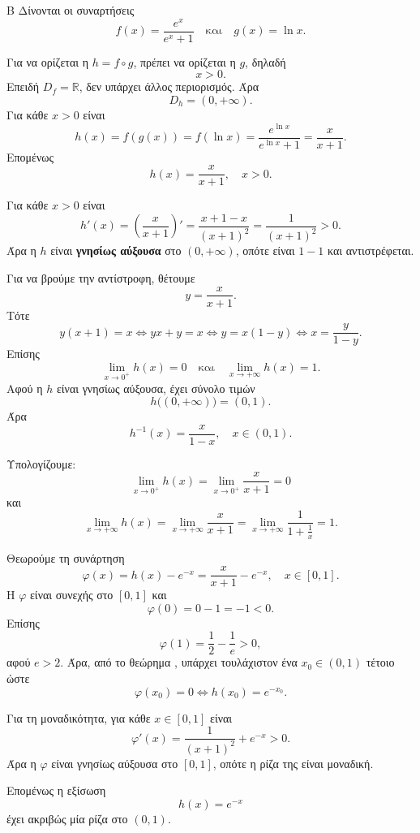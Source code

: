 \begin{thema}{Β}
Δίνονται οι συναρτήσεις
\[
f(x)=\frac{e^x}{e^x+1}
\quad\text{και}\quad
g(x)=\ln x.
\]
\begin{erwthma}
\item Για να ορίζεται η $h=f\circ g$, πρέπει να ορίζεται η $g$, δηλαδή
\[
x>0.
\]
Επειδή $D_f=\mathbb{R}$, δεν υπάρχει άλλος περιορισμός. Άρα
\[
D_h=(0,+\infty).
\]
Για κάθε $x>0$ είναι
\[
h(x)=f(g(x))=f(\ln x)=\frac{e^{\ln x}}{e^{\ln x}+1}
=\frac{x}{x+1}.
\]
Επομένως
\[
{h(x)=\frac{x}{x+1},\quad x>0}.
\]

\item Για κάθε $x>0$ είναι
\[
h'(x)=\left(\frac{x}{x+1}\right)'=\frac{x+1-x}{(x+1)^2}
=\frac{1}{(x+1)^2}>0.
\]
Άρα η $h$ είναι \textbf{γνησίως αύξουσα} στο $(0,+\infty)$, οπότε είναι $1-1$ και αντιστρέφεται.

Για να βρούμε την αντίστροφη, θέτουμε
\[
y=\frac{x}{x+1}.
\]
Τότε
\[
y(x+1)=x
\Leftrightarrow yx+y=x
\Leftrightarrow y=x(1-y)
\Leftrightarrow x=\frac{y}{1-y}.
\]
Επίσης
\[
\lim_{x\to0^+}h(x)=0
\quad\text{και}\quad
\lim_{x\to+\infty}h(x)=1.
\]
Αφού η $h$ είναι γνησίως αύξουσα, έχει σύνολο τιμών
\[
h\bigl((0,+\infty)\bigr)=(0,1).
\]
Άρα
\[
{h^{-1}(x)=\frac{x}{1-x},\quad x\in(0,1)}.
\]

\item Υπολογίζουμε:
\[
\lim_{x\to0^+}h(x)=\lim_{x\to0^+}\frac{x}{x+1}=0
\]
και
\[
\lim_{x\to+\infty}h(x)
=\lim_{x\to+\infty}\frac{x}{x+1}
=\lim_{x\to+\infty}\frac{1}{1+\frac{1}{x}}=1.
\]

\item Θεωρούμε τη συνάρτηση
\[
\varphi(x)=h(x)-e^{-x}=\frac{x}{x+1}-e^{-x},\quad x\in[0,1].
\]
Η $\varphi$ είναι συνεχής στο $[0,1]$ και
\[
\varphi(0)=0-1=-1<0.
\]
Επίσης
\[
\varphi(1)=\frac{1}{2}-\frac{1}{e}>0,
\]
αφού $e>2$. Άρα, από το θεώρημα , υπάρχει τουλάχιστον ένα $x_0\in(0,1)$ τέτοιο ώστε
\[
\varphi(x_0)=0
\Leftrightarrow h(x_0)=e^{-x_0}.
\]

Για τη μοναδικότητα, για κάθε $x\in[0,1]$ είναι
\[
\varphi'(x)=\frac{1}{(x+1)^2}+e^{-x}>0.
\]
Άρα η $\varphi$ είναι γνησίως αύξουσα στο $[0,1]$, οπότε η ρίζα της είναι μοναδική.

Επομένως η εξίσωση
\[
h(x)=e^{-x}
\]
έχει ακριβώς μία ρίζα στο $(0,1)$.
\end{erwthma}
\end{thema}

